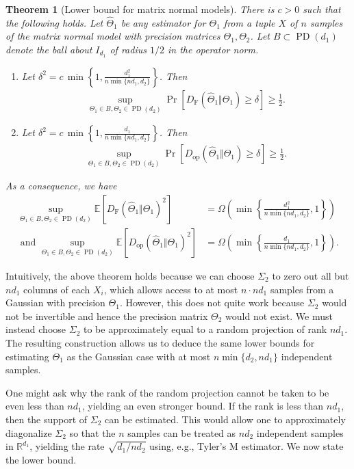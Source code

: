 \documentclass[aos]{imsart}
\newtheorem{theorem}{Theorem}[section]
\theoremstyle{definition}
\numberwithin{equation}{section}
\DeclareMathOperator{\PD}{PD}
\newcommand{\R}{{\mathbb{R}}}
\newcommand{\htheta}{\widehat{\Theta}}
\newcommand{\E}{\mathbb{E}}
\newcommand{\DF}{D_{\operatorname{F}}}
\newcommand{\Dop}{D_{\operatorname{op}}}
\begin{document}
\begin{theorem}[Lower bound for matrix normal models]\label{thm:matrix-lower}
There is $c > 0$ such that the following holds. Let $\htheta_1$ be any estimator for $\Theta_1$ from a tuple $X$ of $n$ samples of the matrix normal model with precision matrices $\Theta_1, \Theta_2$. Let $B\subset \PD(d_1)$ denote the ball about $I_{d_1}$ of radius $1/2$ in the operator norm.
\begin{enumerate}
\item \label{it:frob-lower} Let $\delta^2 = c \, \min \left\{1,\frac{d_1^2}{n \min \{n d_1, d_2\}}\right\}$. Then
\begin{align}
\sup_{\Theta_1 \in B, \Theta_2 \in \PD(d_2)} \Pr\left[ \DF(\htheta_1\Vert  \Theta_1)  \geq \delta\right] \geq \frac{1}{2}.
\end{align}
\item\label{it:op-lower} Let $\delta^2 = c \, \min \left\{1,\frac{d_1}{n \min \{n d_1, d_2\}}\right\}$. Then
 \begin{align}
\sup_{\Theta_1 \in B, \Theta_2 \in \PD(d_2)} \Pr\left[ \Dop(\htheta_1\Vert  \Theta_1) \geq \delta\right] \geq \frac{1}{2}. \label{eq:dop-lower-matrix-normal}
\end{align}
\end{enumerate}
As a consequence, we have
\begin{align*}\sup_{\Theta_1 \in B, \Theta_2 \in \PD(d_2)}\E[\DF(\htheta_1\Vert  \Theta_1)^2] &=\Omega\left( \min \left\{\frac{d_1^2}{n \min \{n d_1, d_2\}},1\right\}\right)\\
\text{ and } \sup_{\Theta_1 \in B, \Theta_2 \in \PD(d_2)}\E[\Dop(\htheta_1\Vert  \Theta_1)^2] &= \Omega\left( \min \left\{\frac{d_1}{n \min \{n d_1, d_2\}},1\right\}\right).\end{align*}
\end{theorem}

Intuitively, the above theorem holds because we can choose $\Sigma_2$ to zero out all but $nd_1$ columns of each $X_i$, which allows access to at most $n \cdot n d_1$ samples from a Gaussian with precision $\Theta_1$. However, this does not quite work because $\Sigma_2$ would not be invertible and hence the precision matrix $\Theta_2$ would not exist. We must instead choose $\Sigma_2$ to be approximately equal to a random projection of rank $n d_1$. The resulting construction allows us to deduce the same lower bounds for estimating $\Theta_1$ as the Gaussian case with at most $n\min \{d_2, n d_1\}$ independent samples.

One might ask why the rank of the random projection cannot be taken to be even less than $n d_1$, yielding an even stronger bound. If the rank is less than $n d_1$, then the support of $\Sigma_2$ can be estimated. This would allow one to approximately diagonalize $\Sigma_2$ so that the $n$ samples can be treated as $nd_2$ independent samples in $\R^{d_1}$, yielding the rate $\sqrt{d_1 / n d_2}$ using, e.g., Tyler's M estimator. We now state the lower bound.
\end{document}

